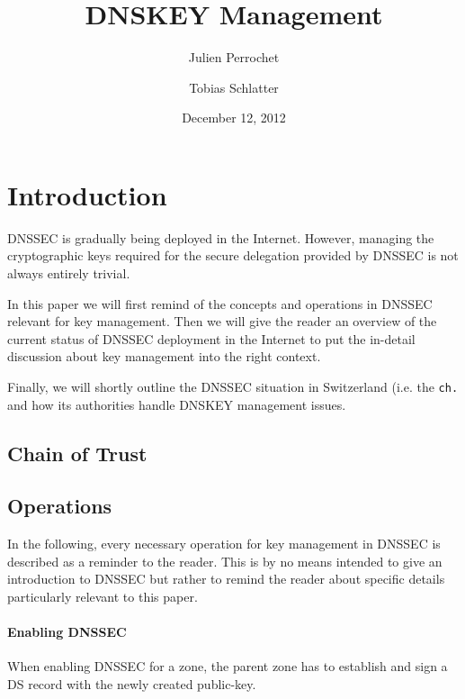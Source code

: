\documentclass[a4paper,twocolumn]{scrartcl}
\title{DNSKEY Management}
\author{Julien Perrochet \and Tobias Schlatter}
\date{December 12, 2012}
\begin{document}



\section{Introduction}
DNSSEC is gradually being deployed in the Internet. However, managing
the cryptographic keys required for the secure delegation provided by
DNSSEC is not always entirely trivial.

In this paper we will first remind of the concepts and operations in
DNSSEC relevant for key management. Then we will give the reader an
overview of the current status of DNSSEC deployment in the Internet to
put the in-detail discussion about key management into the right
context.

Finally, we will shortly outline the DNSSEC situation in Switzerland
(i.e. the \verb|ch.|  and how its authorities handle DNSKEY management
issues.

\subsection{Chain of Trust}

\subsection{Operations}
In the following, every necessary operation for key management in
DNSSEC is described as a reminder to the reader. This is by no means
intended to give an introduction to DNSSEC but rather to remind the
reader about specific details particularly relevant to this paper.

\paragraph{Enabling DNSSEC} When enabling DNSSEC for a zone, the
parent zone has to establish and sign a DS record with the newly
created public-key.
\end{document}
